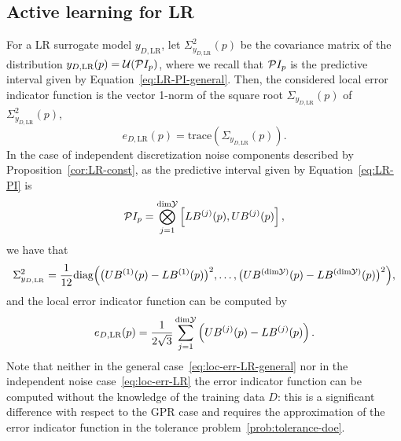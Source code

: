 \subsection{Active learning for LR}\label{sec:LRAL}

For a LR surrogate model $y_{D,\text{LR}}$, let $\Sigma^2_{y_{D,\text{LR}}}(p)$ be the covariance matrix of the distribution $y_{D,\text{LR}}(p) = \mathcal U (\mathcal PI_p)$, where we recall that $\mathcal PI_p$ is the predictive interval given by Equation~\eqref{eq:LR-PI-general}.\newline
Then, the considered local error indicator function is the vector 1-norm of the square root $\Sigma_{y_{D,\text{LR}}}(p)$ of $\Sigma^2_{y_{D,\text{LR}}}(p)$,
\begin{equation} \label{eq:loc-err-LR-general}
    e_{D, \text{LR}}(p) = \text{trace}(\Sigma_{y_{D,\text{LR}}}(p)).
\end{equation}
In the case of independent discretization noise components described by Proposition~\ref{cor:LR-const}, as the predictive interval given by Equation~\eqref{eq:LR-PI} is
\begin{equation*}
    \mathcal PI_p = \bigotimes_{j=1}^{\text{dim}\mathcal Y} \left[ LB^{(j)}(p), UB^{(j)}(p)\right],
\end{equation*}
we have that
\[
    \Sigma^2_{y_{D,\text{LR}}} = \frac{1}{12} \text{diag} \Big ( \big( UB^{(1)}(p) - LB^{(1)}(p)\big)^2, \dots,\big( UB^{(\text{dim}\mathcal Y)}(p) - LB^{(\text{dim}\mathcal Y)}(p) \big)^2 \Big),
\] and the local error indicator function can be computed by 
\begin{equation} \label{eq:loc-err-LR}
    e_{D, \text{LR}}(p) = \frac{1}{2\sqrt{3}} \sum_{j=1}^{\text{dim}\mathcal Y} \left( UB^{(j)}(p) - LB^{(j)}(p) \right).
\end{equation}
Note that neither in the general case~\eqref{eq:loc-err-LR-general} nor in the independent noise case~\eqref{eq:loc-err-LR} the error indicator function can be computed without the knowledge of the training data $D$: this is a significant difference with respect to the GPR case and requires the approximation of the error indicator function in the tolerance problem~\eqref{prob:tolerance-doe}.\medbreak

